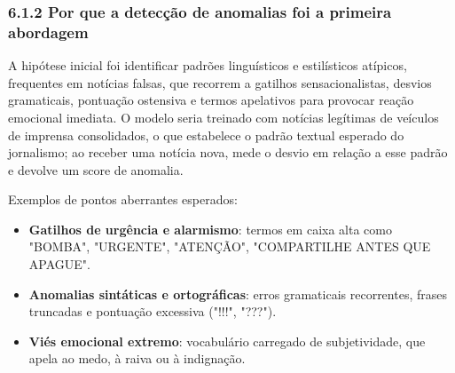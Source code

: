 \documentclass[
  brazilian,
  11pt,
]{article}
\providecommand{\tightlist}{%
  \setlength{\itemsep}{0pt}\setlength{\parskip}{0pt}}
\begin{document}
\subsubsection{6.1.2 Por que a detecção de anomalias foi a primeira abordagem}\label{por-que-a-detecuxe7uxe3o-de-anomalias-foi-a-primeira-abordagem}

A hipótese inicial foi identificar padrões linguísticos e estilísticos atípicos, frequentes em notícias falsas, que recorrem a gatilhos sensacionalistas, desvios gramaticais, pontuação ostensiva e termos apelativos para provocar reação emocional imediata. O modelo seria treinado com notícias legítimas de veículos de imprensa consolidados, o que estabelece o padrão textual esperado do jornalismo; ao receber uma notícia nova, mede o desvio em relação a esse padrão e devolve um score de anomalia.

Exemplos de pontos aberrantes esperados:

\begin{itemize}
\tightlist
\item
  \textbf{Gatilhos de urgência e alarmismo}: termos em caixa alta como "BOMBA", "URGENTE", "ATENÇÃO", "COMPARTILHE ANTES QUE APAGUE".
\item
  \textbf{Anomalias sintáticas e ortográficas}: erros gramaticais recorrentes, frases truncadas e pontuação excessiva ("!!!", "???").
\item
  \textbf{Viés emocional extremo}: vocabulário carregado de subjetividade, que apela ao medo, à raiva ou à indignação.
\end{itemize}
\end{document}

